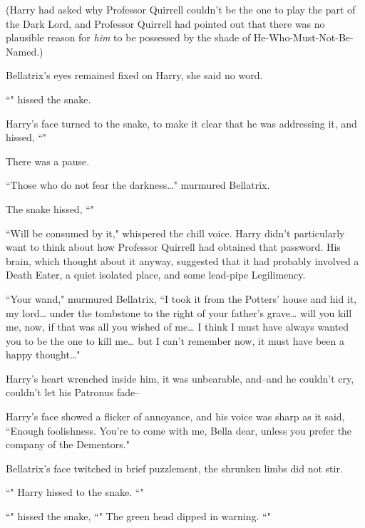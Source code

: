 (Harry had asked why Professor Quirrell couldn't be the one to play the part of the Dark Lord, and Professor Quirrell had pointed out that there was no plausible reason for \emph{him} to be possessed by the shade of He-Who-Must-Not-Be-Named.)

Bellatrix's eyes remained fixed on Harry, she said no word.

``" hissed the snake.

Harry's face turned to the snake, to make it clear that he was addressing it, and hissed, ``"

There was a pause.

``Those who do not fear the darkness{\ldots}" murmured Bellatrix.

The snake hissed, ``"

``Will be consumed by it," whispered the chill voice. Harry didn't particularly want to think about how Professor Quirrell had obtained that password. His brain, which thought about it anyway, suggested that it had probably involved a Death Eater, a quiet isolated place, and some lead-pipe Legilimency.

``Your wand," murmured Bellatrix, ``I took it from the Potters' house and hid it, my lord{\ldots} under the tombstone to the right of your father's grave{\ldots} will you kill me, now, if that was all you wished of me{\ldots} I think I must have always wanted you to be the one to kill me{\ldots} but I can't remember now, it must have been a happy thought{\ldots}"

Harry's heart wrenched inside him, it was unbearable, and\---and he couldn't cry, couldn't let his Patronus fade\---

Harry's face showed a flicker of annoyance, and his voice was sharp as it said, ``Enough foolishness. You're to come with me, Bella dear, unless you prefer the company of the Dementors."

Bellatrix's face twitched in brief puzzlement, the shrunken limbs did not stir.

``" Harry hissed to the snake. ``"

``" hissed the snake, ``" The green head dipped in warning. ``"

